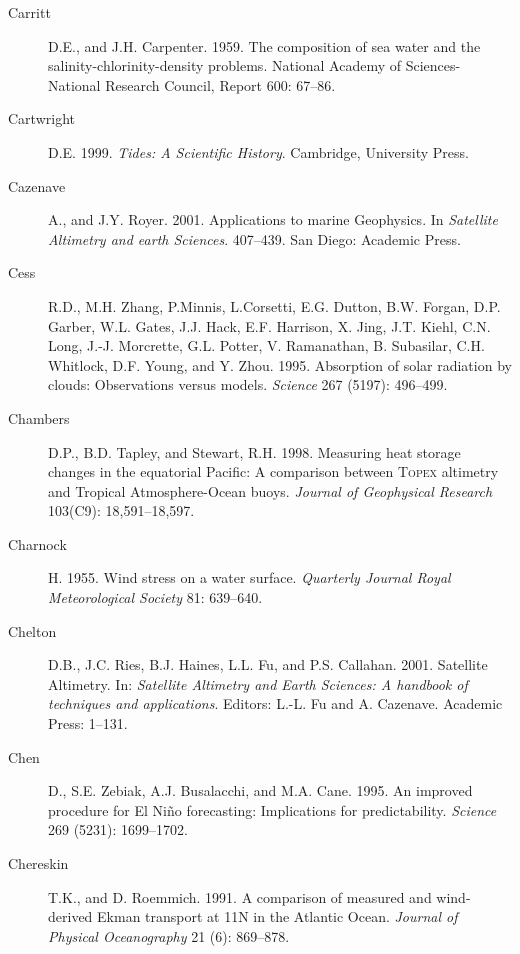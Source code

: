 \begin{description}
\item [Carritt]D.E., and J.H. Carpenter. 1959. The composition of sea
  water and the salinity-chlorinity-density problems. National Academy
  of Sciences-National Research Council, Report 600: 67--86.

\item [Cartwright]D.E. 1999. \textit{Tides: A Scientific
  History}. Cambridge, University Press.

\item [Cazenave]A., and J.Y. Royer. 2001. Applications to marine
  Geophysics. In \textit{Satellite Altimetry and earth
    Sciences}. 407--439. San Diego: Academic Press.

\item [Cess]R.D., M.H. Zhang, P.Minnis, L.Corsetti, E.G. Dutton,
  B.W. Forgan, D.P. Garber, W.L. Gates, J.J. Hack, E.F. Harrison,
  X. Jing, J.T. Kiehl, C.N.  Long, J.-J. Morcrette, G.L. Potter,
  V. Ramanathan, B. Subasilar, C.H. Whitlock, D.F. Young, and
  Y. Zhou. 1995. Absorption of solar radiation by clouds: Observations
  versus models. \textit{Science} 267 (5197): 496--499.

\item[Chambers]D.P., B.D. Tapley, and Stewart, R.H. 1998. Measuring
  heat storage changes in the equatorial Pacific: A comparison between
  \textsc{Topex} altimetry and Tropical Atmo\-sphere-Ocean
  buoys. \textit{Journal of Geophysical Research} 103(C9):
  18,591--18,597.

\item [Charnock]H. 1955. Wind stress on a water
  surface. \textit{Quarterly Journal Royal Meteorological Society} 81:
  639--640.

\item [Chelton]D.B., J.C. Ries, B.J. Haines, L.L. Fu, and
  P.S. Callahan. 2001. Satellite Altimetry. In: \textit{Satellite
    Altimetry and Earth Sciences: A handbook of techniques and
    applications}. Editors: L.-L. Fu and A. Cazenave. Academic Press:
  1--131.

\item [Chen]D., S.E. Zebiak, A.J. Busalacchi, and M.A. Cane. 1995. An
  improved procedure for El Ni\~{n}o forecasting: Implications for
  predictability.  \textit{Science} 269 (5231): 1699--1702.

\item [Chereskin]T.K., and D. Roemmich. 1991. A comparison of measured
  and wind-derived Ekman transport at 11\degrees N in the Atlantic
  Ocean.  \textit{Journal of Physical Oceanography} 21 (6): 869--878.


\end{description}
